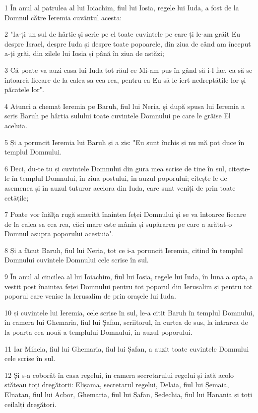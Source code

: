 \par 1 În anul al patrulea al lui Ioiachim, fiul lui Iosia, regele lui Iuda, a fost de la Domnul către Ieremia cuvântul acesta:
\par 2 "Ia-ți un sul de hârtie și scrie pe el toate cuvintele pe care ți le-am grăit Eu despre Israel, despre Iuda și despre toate popoarele, din ziua de când am început a-ți grăi, din zilele lui Iosia și până în ziua de astăzi;
\par 3 Că poate va auzi casa lui Iuda tot răul ce Mi-am pus în gând să i-l fac, ca să se întoarcă fiecare de la calea sa cea rea, pentru ca Eu să le iert nedreptățile lor și păcatele lor".
\par 4 Atunci a chemat Ieremia pe Baruh, fiul lui Neria, și după spusa lui Ieremia a scris Baruh pe hârtia sulului toate cuvintele Domnului pe care le grăise El aceluia.
\par 5 Și a poruncit Ieremia lui Baruh și a zis: "Eu sunt închis și nu mă pot duce în templul Domnului.
\par 6 Deci, du-te tu și cuvintele Domnului din gura mea scrise de tine în sul, citește-le în templul Domnului, în ziua postului, în auzul poporului; citește-le de asemenea și în auzul tuturor acelora din Iuda, care sunt veniți de prin toate cetățile;
\par 7 Poate vor înălța rugă smerită înaintea feței Domnului și se va întoarce fiecare de la calea sa cea rea, căci mare este mânia și supărarea pe care a arătat-o Domnul asupra poporului acestuia".
\par 8 Și a făcut Baruh, fiul lui Neria, tot ce i-a poruncit Ieremia, citind în templul Domnului cuvintele Domnului cele scrise în sul.
\par 9 În anul al cincilea al lui Ioiachim, fiul lui Iosia, regele lui Iuda, în luna a opta, a vestit post înaintea feței Domnului pentru tot poporul din Ierusalim și pentru tot poporul care venise la Ierusalim de prin orașele lui Iuda.
\par 10 și cuvintele lui Ieremia, cele scrise în sul, le-a citit Baruh în templul Domnului, în camera lui Ghemaria, fiul lui Șafan, scriitorul, în curtea de sus, la intrarea de la poarta cea nouă a templului Domnului, în auzul poporului.
\par 11 Iar Miheia, fiul lui Ghemaria, fiul lui Șafan, a auzit toate cuvintele Domnului cele scrise în sul.
\par 12 Și s-a coborât în casa regelui, în camera secretarului regelui și iată acolo stăteau toți dregătorii: Elișama, secretarul regelui, Delaia, fiul lui Șemaia, Elnatan, fiul lui Acbor, Ghemaria, fiul lui Șafan, Sedechia, fiul lui Hanania și toți ceilalți dregători.
